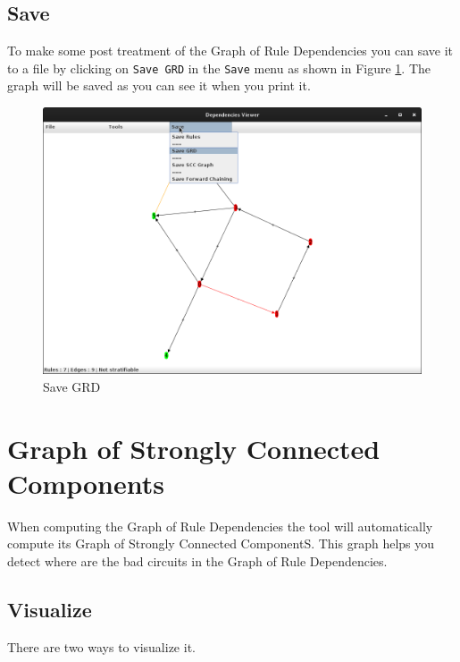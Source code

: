 \documentclass[a4paper, 10pt]{article}
\begin{document}
\subsection{Save}
To make some post treatment of the Graph of Rule Dependencies you can save it to a file by clicking on \verb=Save GRD= in the \verb=Save= menu as shown in Figure \ref{fig6}. The graph will be saved as you can see it when you print it.
\begin{figure}
\begin{center}
  \includegraphics[scale=0.25]{pics/fig6.png}
  \caption{Save GRD}
\end{center}
\label{fig6}
\end{figure}


\newpage

\section{Graph of Strongly Connected Components}
When computing the Graph of Rule Dependencies the tool will automatically compute its Graph of Strongly Connected ComponentS. This graph helps you detect where are the bad circuits in the Graph of Rule Dependencies.

\subsection{Visualize}
There are two ways to visualize it.
\end{document}

